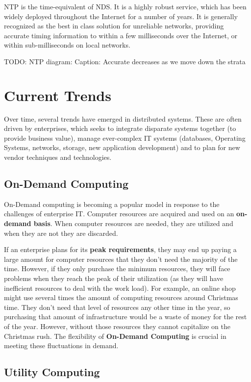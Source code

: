 \documentclass{article}
\begin{document}
NTP is the time-equivalent of NDS. It is a highly robust service, which has been widely deployed throughout the Internet for a number of years. It is generally recognized as the best in class solution for unreliable networks, providing accurate timing information to within a few milliseconds over the Internet, or within sub-milliseconds on local networks.

TODO: NTP diagram: Caption: Accurate decreases as we move down the strata


\section{Current Trends}

Over time, several trends have emerged in distributed systems. These are often driven by enterprises, which seeks to integrate disparate systems together (to provide business value), manage ever-complex IT systems (databases, Operating Systems, networks, storage, new application development) and to plan for new vendor techniques and technologies.

\subsection{On-Demand Computing}

On-Demand computing is becoming a popular model in response to the challenges of enterprise IT. Computer resources are acquired and used on an \textbf{on-demand basis}. When computer resources are needed, they are utilized and when they are not they are discarded. 

If an enterprise plans for its \textbf{peak requirements}, they may end up paying a large amount for computer resources that they don't need the majority of the time. However, if they only purchase the minimum resources, they will face problems when they reach the peak of their utilization (as they will have inefficient resources to deal with the work load). For example, an online shop might use several times the amount of computing resources around Christmas time. They don't need that level of resources any other time in the year, so purchasing that amount of infrastructure would be a waste of money for the rest of the year. However, without those resources they cannot capitalize on the Christmas rush. The flexibility of \textbf{On-Demand Computing} is crucial in meeting these fluctuations in demand.

\subsection{Utility Computing}
\end{document}
